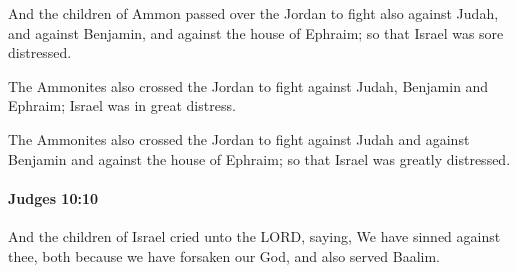 			\begin{versebox}
					\item[BHS] 
					\item[ASV] And the children of Ammon passed over the Jordan to fight also against Judah, and against Benjamin, and against the house of Ephraim; so that Israel was sore distressed.
					\item[NIV] The Ammonites also crossed the Jordan to fight against Judah, Benjamin and Ephraim; Israel was in great distress.
					\item[NRSV] The Ammonites also crossed the Jordan to fight against Judah and against Benjamin and against the house of Ephraim; so that Israel was greatly distressed.
			\end{versebox}

		\paragraph{Judges 10:10} %
			\label{JUDGES-10-10}

			And the children of Israel cried unto the LORD, saying, We have sinned against thee, both because we have forsaken our God, and also served Baalim.

